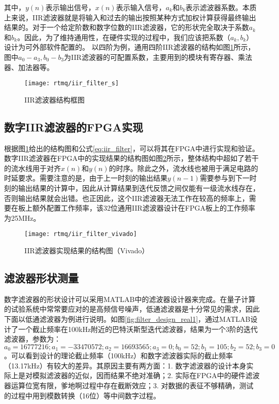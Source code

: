 
其中，$y(n)$表示输出信号，$x(n)$表示输入信号，$a_k$和$b_k$表示滤波器系数。本质上来说，IIR滤波器就是将输入和过去的输出按照某种方式加权计算获得最终输出结果的。对于一个给定阶数和数字位数的IIR滤波器，它的形状完全取决于系数$a_k$和$b_k$。因此，为了维持通用性，在硬件实现的过程中，我们应该把系数（$a_k, b_k$）设计为可外部软件配置的。
以四阶为例，通用四阶IIR滤波器的结构如图\ref{fig:iir_filter_s}所示，图中$a_0-a_3, b_0-b_3$为IIR滤波器的可配置系数，主要用到的模块有寄存器、乘法器、加法器等。
\begin{figure}
    \centering
    \caption[IIR滤波器结构框图]{IIR滤波器结构框图\label{fig:iir_filter_s}}
    \texttt{[image: rtmq/iir\_filter\_s]}
\end{figure}


\subsection[数字IIR滤波器的FPGA实现]{数字IIR滤波器的FPGA实现}

根据图\ref{fig:iir_filter_s}给出的结构图和公式\eqref{eq:iir_filter}，可以将其在FPGA中进行实现和验证。数字IIR滤波器在FPGA中的实现结果的结构图如图\ref{fig:iir_filter_vivado}所示，整体结构中超如了若干的流水线用于对齐$x(n)$和$y(n)$的时序。除此之外，流水线也被用于满足电路的时延要求。需要注意的是，由于上一时刻的输出结果$y(n-1)$需要参与到下一时刻的输出结果的计算中，因此从计算结果到迭代反馈之间仅能有一级流水线存在，否则输出结果就会出错。也正因此，这个IIR滤波器无法工作在较高的频率上，需要在板上额外配置工作频率，该32位通用IIR滤波器设计在FPGA板上的工作频率为25MHz。

\begin{figure}
    \centering
    \caption[IIR滤波器实现结果的结构图]{IIR滤波器实现结果的结构图（Vivado）\label{fig:iir_filter_vivado}}
    \texttt{[image: rtmq/iir\_filter\_vivado]}
\end{figure}




\subsection[滤波器形状测量]{滤波器形状测量}
数字滤波器的形状设计可以采用MATLAB中的滤波器设计器来完成。在量子计算的试验系统中常常要应对的是高频信号噪声，低通滤波器是十分常见的需求，因此下面以低通滤波器为例进行说明。如图\ref{fig:filter_design_real1}，通过MATLAB设计了一个截止频率在100kHz附近的巴特沃斯型迭代滤波器，结果为一个3阶的迭代滤波器，参数为：$a_0=16777216;
a_1=-33470572;
a_2=16693565;
a_3=0;
b_0=52;
b_1=105;
b_2=52;
b_3=0$。可以看到设计的理论截止频率（100kHz）和数字滤波器实际的截止频率（13.17kHz）有较大的差异。其原因主要有两方面：1. 数字滤波器的设计本身实际上是对模拟滤波器的近似，因而结果不绝对准确；2. 实际在FPGA中的硬件滤波器运算位宽有限，爹地啊过程中存在截断效应；3. 对数据的表征不够精确，测试的过程中用到模数转换（16位）等中间数字过程。

